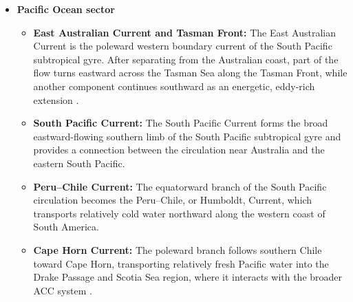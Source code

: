 \documentclass[
  draft
]{agujournal2025}
\begin{document}
\begin{itemize}
\begin{itemize}
                \item \textbf{Agulhas Leakage:}
                A fraction of the Agulhas transport enters the South Atlantic through rings, eddies, filaments, and direct inflow. This leakage transfers warm and saline Indian Ocean water into the Atlantic and represents an important connection between the subtropical gyres of the two basins \cite{art:beal2011}.
        
                \item \textbf{Leeuwin Current:}
                The Leeuwin Current is a warm, poleward eastern boundary current flowing along western and southwestern Australia. Its continuation contributes to the exchange between the eastern Indian Ocean, the Great Australian Bight, and the circulation north of the ACC \cite{art:waite2007}.
        
            \end{itemize}
        
        
            \item \textbf{Pacific Ocean sector}
            \begin{itemize}
        
                \item \textbf{East Australian Current and Tasman Front:}
                The East Australian Current is the poleward western boundary current of the South Pacific subtropical gyre. After separating from the Australian coast, part of the flow turns eastward across the Tasman Sea along the Tasman Front, while another component continues southward as an energetic, eddy-rich extension \cite{art:oke2019}.
        
                \item \textbf{South Pacific Current:}
                The South Pacific Current forms the broad eastward-flowing southern limb of the South Pacific subtropical gyre and provides a connection between the circulation near Australia and the eastern South Pacific.
                
                \item \textbf{Peru--Chile Current:}
                The equatorward branch of the South Pacific circulation becomes the Peru--Chile, or Humboldt, Current, which transports relatively cold water northward along the western coast of South America. 
                
                \item \textbf{Cape Horn Current:}
                The poleward branch follows southern Chile toward Cape Horn, transporting relatively fresh Pacific water into the Drake Passage and Scotia Sea region, where it interacts with the broader ACC system \cite{art:zheng2023}.
        
            \end{itemize}
        
        \end{itemize}
        
\end{document}
